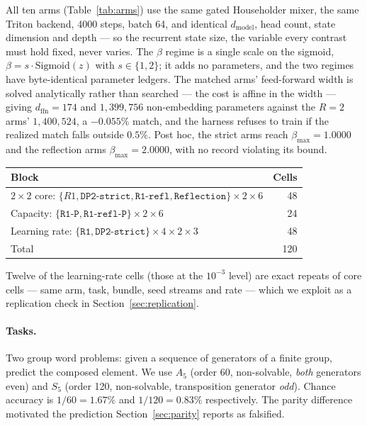 \documentclass[10pt,twocolumn]{article}
\begin{document}
All ten arms (Table~\ref{tab:arms}) use the same gated Householder mixer, the
same Triton backend, 4000 steps, batch 64, and identical $d_\text{model}$, head
count, state dimension and depth --- so the recurrent state size, the variable
every contrast must hold fixed, never varies. The $\beta$ regime is a single
scale on the sigmoid, $\beta = s\cdot\mathrm{Sigmoid}(z)$ with $s\in\{1,2\}$; it
adds no parameters, and the two regimes have byte-identical parameter ledgers.
The matched arms' feed-forward width is solved analytically rather than searched
--- the cost is affine in the width --- giving $d_\text{ffn}=174$ and
$1{,}399{,}756$ non-embedding parameters against the $R{=}2$ arms'
$1{,}400{,}524$, a $-0.055\%$ match, and the harness refuses to train if the
realized match falls outside $0.5\%$. Post hoc, the strict arms reach
$\beta_{\max}=1.0000$ and the reflection arms $\beta_{\max}=2.0000$, with no
record violating its bound.

\begin{center}
\footnotesize
\begin{tabular}{lr}
\toprule
Block & Cells \\
\midrule
$2\times2$ core: $\{R1, \texttt{DP2-strict}, \texttt{R1-refl},
  \texttt{Reflection}\} \times 2 \times 6$ & 48 \\
Capacity: $\{\texttt{R1-P}, \texttt{R1-refl-P}\} \times 2 \times 6$ & 24 \\
Learning rate: $\{\texttt{R1}, \texttt{DP2-strict}\} \times 4 \times 2 \times 3$ & 48 \\
\midrule
Total & 120 \\
\bottomrule
\end{tabular}
\end{center}

\noindent Twelve of the learning-rate cells (those at the $10^{-3}$ level) are
exact repeats of core cells --- same arm, task, bundle, seed streams and rate ---
which we exploit as a replication check in Section~\ref{sec:replication}.

\paragraph{Tasks.}
Two group word problems: given a sequence of generators of a finite group,
predict the composed element. We use $A_5$ (order 60, non-solvable, \emph{both}
generators even) and $S_5$ (order 120, non-solvable, transposition generator
\emph{odd}). Chance accuracy is $1/60 = 1.67\%$ and $1/120 = 0.83\%$
respectively. The parity difference motivated the prediction
Section~\ref{sec:parity} reports as falsified.
\end{document}
